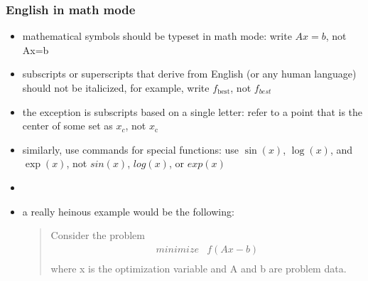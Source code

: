 \documentclass[usepdftitle=false]{beamer}
\begin{document}
\begin{frame}
    \frametitle{English in math mode}

    \begin{itemize}\itemsep=12pt
        \item mathematical symbols should be typeset in math mode: write $Ax=b$, not \textrm{Ax=b}
        \item subscripts or superscripts that derive from English (or any human language) should not be italicized, for example, write $f_\mathrm{best}$, not $f_{best}$
        \item the exception is subscripts based on a single letter: refer to a point that is the center of some set as $x_c$, not $x_{\mathrm{c}}$
        \item similarly, use commands for special functions: use $\sin(x)$, $\log(x)$, and $\exp(x)$, not $sin(x)$, $log(x)$, or $exp(x)$
        \item[] 
        \item a really heinous example would be the following:
            \begin{quote}
                Consider the problem
                \[
                    \begin{array}{ll}
                        minimize & f(Ax - b) \\
                    \end{array}
                \]
                where x is the optimization variable and A and b are problem data.
            \end{quote}
    \end{itemize}
\end{frame}
\end{document}
